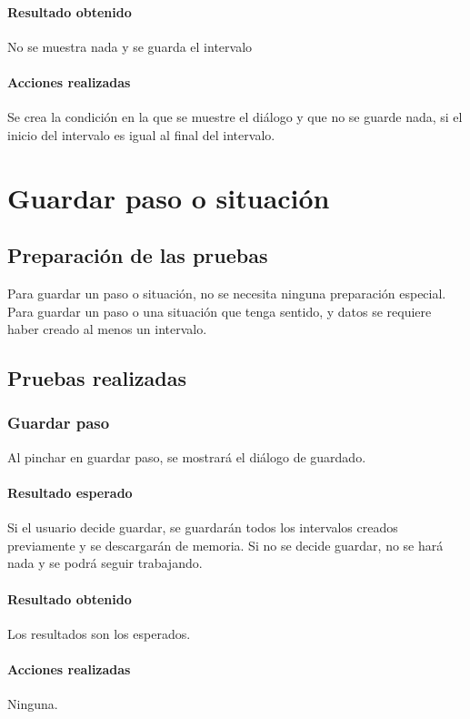\paragraph{Resultado obtenido}
No se muestra nada y se guarda el intervalo

\paragraph{Acciones realizadas}
Se crea la condici\'on en la que se muestre el
di\'alogo y que no se guarde nada, si el inicio del intervalo
es igual al final del intervalo.

\section{Guardar paso o situaci\'on}
\subsection{Preparaci\'on de las pruebas}
Para guardar un paso o situaci\'on, no se necesita ninguna preparaci\'on especial.
Para guardar un paso o una situaci\'on que tenga sentido, y datos se requiere haber creado al menos un 
intervalo. 

\subsection{Pruebas realizadas}
\subsubsection{Guardar paso}
Al pinchar en guardar paso, se mostrar\'a el di\'alogo de guardado.

\paragraph{Resultado esperado}
Si el usuario decide guardar, se guardar\'an todos los intervalos
creados previamente y se descargar\'an de memoria. Si no se decide
guardar, no se har\'a nada y se podr\'a seguir trabajando.

\paragraph{Resultado obtenido}
Los resultados son los esperados.

\paragraph{Acciones realizadas}
Ninguna.

